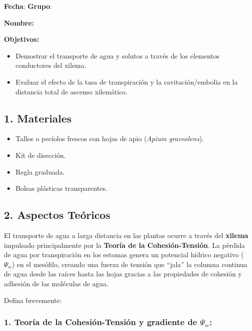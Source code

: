 \documentclass[
  spanish,
  10pt,
  letterpaper,
  twocolumn]{article}
\title{\vspace{-1.5em}{\Huge \textbf{Práctica 3 -- Transporte a través
del Xilema}}\vspace{-1.5em}}
\date{}
\providecommand{\tightlist}{%
  \setlength{\itemsep}{0pt}\setlength{\parskip}{0pt}}
\begin{document}
\maketitle


\textbf{Fecha}: \hrulefill \hfill \textbf{Grupo}: \hrulefill

\textbf{Nombre:} \hrulefill

\textbf{Objetivos:}

\begin{itemize}
\tightlist
\item
  Demostrar el transporte de agua y solutos a través de los elementos
  conductores del xilema.
\item
  Evaluar el efecto de la tasa de transpiración y la cavitación/embolia
  en la distancia total de ascenso xilemático.
\end{itemize}

\subsection{1. Materiales}\label{materiales}

\begin{itemize}
\tightlist
\item
  Tallos o pecíolos frescos con hojas de apio (\emph{Apium graveolens}).
\item
  Kit de disección.
\item
  Regla graduada.
\item
  Bolsas plásticas transparentes.
\end{itemize}

\subsection{2. Aspectos Teóricos}\label{aspectos-teuxf3ricos}

El transporte de agua a larga distancia en las plantas ocurre a través
del \textbf{xilema} impulsado principalmente por la \textbf{Teoría de la
Cohesión-Tensión}. La pérdida de agua por transpiración en los estomas
genera un potencial hídrico negativo (\(\Psi_w\)) en el mesófilo,
creando una fuerza de tensión que ``jala'' la columna continua de agua
desde las raíces hasta las hojas gracias a las propiedades de cohesión y
adhesión de las moléculas de agua.

Defina brevemente:

\subsubsection{\texorpdfstring{\textbf{1. Teoría de la Cohesión-Tensión
y gradiente de
\(\Psi_w\):}}{1. Teoría de la Cohesión-Tensión y gradiente de \textbackslash Psi\_w:}}\label{teoruxeda-de-la-cohesiuxf3n-tensiuxf3n-y-gradiente-de-psi_w}
\end{document}
